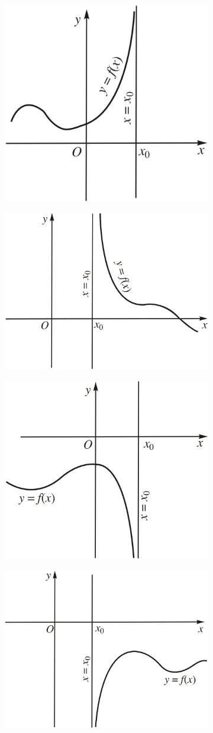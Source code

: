 \documentclass{article}
\numberwithin{equation}{section}
\begin{document}
\begin{figure}[h]
	\centering
	\begin{subfigure}{.5\textwidth}
		\centering
		\includegraphics[width=.5\linewidth]{tiem_can_dung_a}
		\caption{}
	\end{subfigure}%
	\begin{subfigure}{.5\textwidth}
		\centering
		\includegraphics[width=.5\linewidth]{tiem_can_dung_b}
		\caption{}
	\end{subfigure}
	\begin{subfigure}{.5\textwidth}
		\centering
		\includegraphics[width=.5\linewidth]{tiem_can_dung_c}
		\caption{}
	\end{subfigure}%
	\begin{subfigure}{.5\textwidth}
		\centering
		\includegraphics[width=.5\linewidth]{tiem_can_dung_d}

\end{subfigure}
\end{figure}
\end{document}
